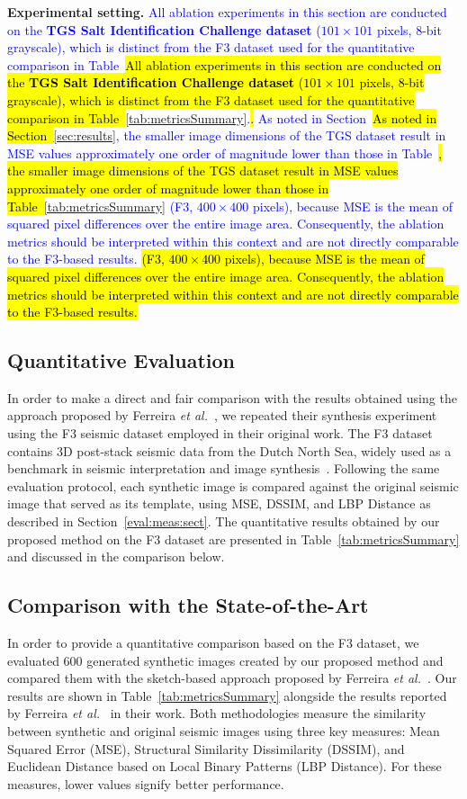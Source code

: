 \documentclass{ieeeaccess}
\providecommand{\DIFaddbegin}{} %
\providecommand{\DIFaddend}{} %
\newcommand{\DIFaddincludegraphics}[2][]{{\color{blue}\fbox{\DIFOincludegraphics[#1]{#2}}}} %
\DeclareRobustCommand{\DIFaddbegin}{\DIFOaddbegin \let\includegraphics\DIFaddincludegraphics} %
\DeclareRobustCommand{\DIFaddend}{\DIFOaddend \let\includegraphics\DIFOincludegraphics} %
\providecommand{\DIFadd}[1]{\ifmmode\textcolor{blue}{#1}\else\hl{#1}\fi}
\renewcommand{\DIFadd}[1]{\ifmmode\textcolor{blue}{#1}\else\hl{#1}\fi}
\begin{document}
\bigskip
\noindent\parbox{0.97\linewidth}{%
\textbf{Experimental setting.} \DIFadd{All ablation experiments in this section are conducted on the \textbf{TGS Salt Identification Challenge dataset} ($101 \times 101$ pixels, 8-bit grayscale), which is distinct from the F3 dataset used for the quantitative comparison in Table~}\DIFaddend \ref{tab:metricsSummary}\DIFaddbegin \DIFadd{.} \DIFadd{As noted in Section~}\DIFaddend \ref{sec:results}\DIFaddbegin \DIFadd{, the smaller image dimensions of the TGS dataset result in MSE values approximately one order of magnitude lower than those in Table~}\DIFaddend \ref{tab:metricsSummary}\DIFaddbegin \DIFadd{ (F3, $400 \times 400$ pixels), because MSE is the mean of squared pixel differences over the entire image area. Consequently, the ablation metrics should be interpreted within this context and are not directly comparable to the F3-based results.}
}
\DIFaddend
\subsection{Quantitative Evaluation}

In order to make a direct and fair comparison with the results obtained using the approach proposed by Ferreira \emph{et al.}~\cite{Ferreira2020}, we repeated their synthesis experiment using the F3 seismic dataset employed in their original work. The F3 dataset contains 3D post-stack seismic data from the Dutch North Sea, widely used as a benchmark in seismic interpretation and image synthesis~\cite{Baroni2018}. Following the same evaluation protocol, each synthetic image is compared against the original seismic image that served as its template, using MSE, DSSIM, and LBP Distance as described in Section~\ref{eval:meas:sect}. The quantitative results obtained by our proposed method on the F3 dataset are presented in Table~\ref{tab:metricsSummary} and discussed in the comparison below.


\subsection{Comparison with the State-of-the-Art}

In order to provide a quantitative comparison based on the F3 dataset, we evaluated 600 generated synthetic images created by our proposed method and compared them with the sketch-based approach proposed by Ferreira \emph{et al.}~\cite{Ferreira2020}. Our results are shown in Table~\ref{tab:metricsSummary} alongside the results reported by Ferreira \emph{et al.}~\cite{Ferreira2020} in their work. Both methodologies measure the similarity between synthetic and original seismic images using three key measures: Mean Squared Error (MSE), Structural Similarity Dissimilarity (DSSIM), and Euclidean Distance based on Local Binary Patterns (LBP Distance). For these measures, lower values signify better performance.
\end{document}
